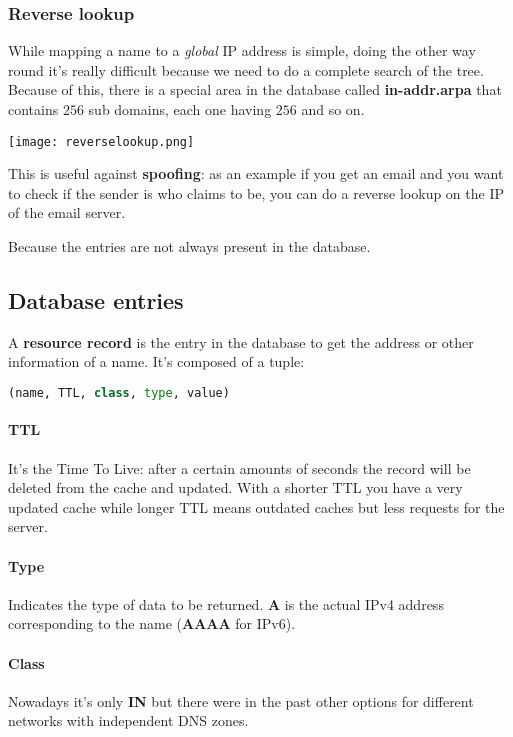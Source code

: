 \subsubsection{Reverse lookup}
While mapping a name to a \textit{global} IP address is simple, doing the other way round it's really difficult because we need to do a complete search of the tree. \\
Because of this, there is a special area in the database called \textbf{in-addr.arpa} that contains $256$ sub domains, each one having $256$ and so on.
\begin{center}
	\texttt{[image: reverselookup.png]}
\end{center}
\begin{note}
	This is useful against \textbf{spoofing}: as an example if you get an email and you want to check if the sender is who claims to be, you can do a reverse lookup on the IP of the email server.
\end{note}

\begin{question}
	Because the entries are not always present in the database.
\end{question}

\subsection{Database entries}
A \textbf{resource record} is the entry in the database to get the address or other information of a name. It's composed of a tuple:
\begin{lstlisting}[language=Python]
	(name, TTL, class, type, value)
\end{lstlisting}
\paragraph{TTL} It's the Time To Live: after a certain amounts of seconds the record will be deleted from the cache and updated. With a shorter TTL you have a very updated cache while longer TTL means outdated caches but less requests for the server.
\paragraph{Type} Indicates the type of data to be returned. \textbf{A} is the actual IPv4 address corresponding to the name (\textbf{AAAA} for IPv6). 
\paragraph{Class} Nowadays it's only \textbf{IN} but there were in the past other options for different networks with independent DNS zones.

